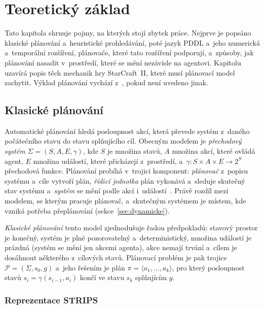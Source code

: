 \chapter{Teoretický základ}
\label{chap:teorie}

Tato kapitola shrnuje pojmy, na kterých stojí zbytek práce. Nejprve je popsáno klasické plánování a~heuristické prohledávání, poté jazyk PDDL a~jeho numerická a~temporální rozšíření, plánovače, které tato rozšíření podporují, a~způsoby, jak plánování nasadit v~prostředí, které se mění nezávisle na agentovi. Kapitolu uzavírá popis těch mechanik hry StarCraft~II, které musí plánovací model zachytit. Výklad plánování vychází z~\cite{Ghallab2004}, pokud není uvedeno jinak.

\section{Klasické plánování}
\label{sec:klasicke}

Automatické plánování hledá posloupnost akcí, která převede systém z~daného počátečního stavu do stavu splňujícího cíl. Obecným modelem je \emph{přechodový systém} $\Sigma = (S, A, E, \gamma)$, kde $S$ je množina stavů, $A$ množina akcí, které ovládá agent, $E$ množina událostí, které přicházejí z~prostředí, a~$\gamma: S \times A \times E \to 2^{S}$ přechodová funkce. Plánování probíhá v~trojici komponent: \emph{plánovač} z~popisu systému a~cíle vytvoří plán, \emph{řídicí jednotka} plán vykonává a~sleduje skutečný stav systému a~\emph{systém} se mění podle akcí i~událostí~\cite{Ghallab2004}. Právě rozdíl mezi modelem, se kterým pracuje plánovač, a~skutečným systémem je místem, kde vzniká potřeba přeplánování (sekce~\ref{sec:dynamicke}).

\emph{Klasické plánování} tento model zjednodušuje řadou předpokladů: stavový prostor je konečný, systém je plně pozorovatelný a~deterministický, množina událostí je prázdná (systém se mění jen akcemi agenta), akce nemají trvání a~cílem je dosáhnout některého z~cílových stavů. Plánovací problém je pak trojice $\mathcal{P} = (\Sigma, s_0, g)$ a~jeho řešením je plán $\pi = \langle a_1, \dots, a_k \rangle$, pro který posloupnost stavů $s_i = \gamma(s_{i-1}, a_i)$ končí ve stavu $s_k$ splňujícím $g$.

\subsection{Reprezentace STRIPS}

